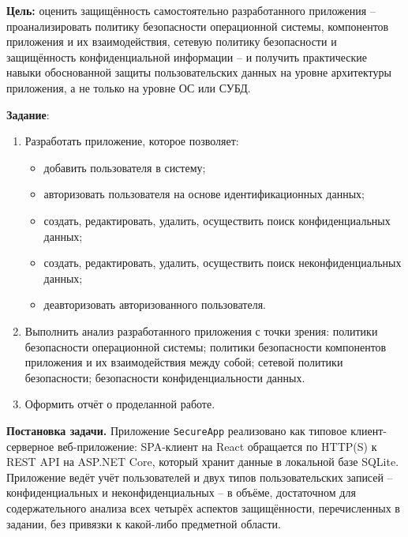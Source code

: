 
\textbf{Цель:} оценить защищённость самостоятельно разработанного
приложения -- проанализировать политику безопасности операционной
системы, компонентов приложения и их взаимодействия, сетевую политику
безопасности и защищённость конфиденциальной информации -- и получить
практические навыки обоснованной защиты пользовательских данных на
уровне архитектуры приложения, а не только на уровне ОС или СУБД.

\vspace{1em}

\textbf{Задание}:
\begin{enumerate}
  \item Разработать приложение, которое позволяет:
  \begin{itemize}
    \item добавить пользователя в систему;
    \item авторизовать пользователя на основе идентификационных данных;
    \item создать, редактировать, удалить, осуществить поиск
    конфиденциальных данных;
    \item создать, редактировать, удалить, осуществить поиск
    неконфиденциальных данных;
    \item деавторизовать авторизованного пользователя.
  \end{itemize}
  \item Выполнить анализ разработанного приложения с точки зрения:
  политики безопасности операционной системы; политики безопасности
  компонентов приложения и их взаимодействия между собой; сетевой
  политики безопасности; безопасности конфиденциальности данных.
  \item Оформить отчёт о проделанной работе.
\end{enumerate}

\textbf{Постановка задачи.} Приложение \texttt{SecureApp} реализовано как
типовое клиент-серверное веб-приложение: SPA-клиент на React обращается по
HTTP(S) к REST API на ASP.NET Core, который хранит данные в локальной базе
SQLite. Приложение ведёт учёт пользователей и двух типов пользовательских
записей -- конфиденциальных и неконфиденциальных -- в объёме, достаточном
для содержательного анализа всех четырёх аспектов защищённости,
перечисленных в задании, без привязки к какой-либо предметной области.
